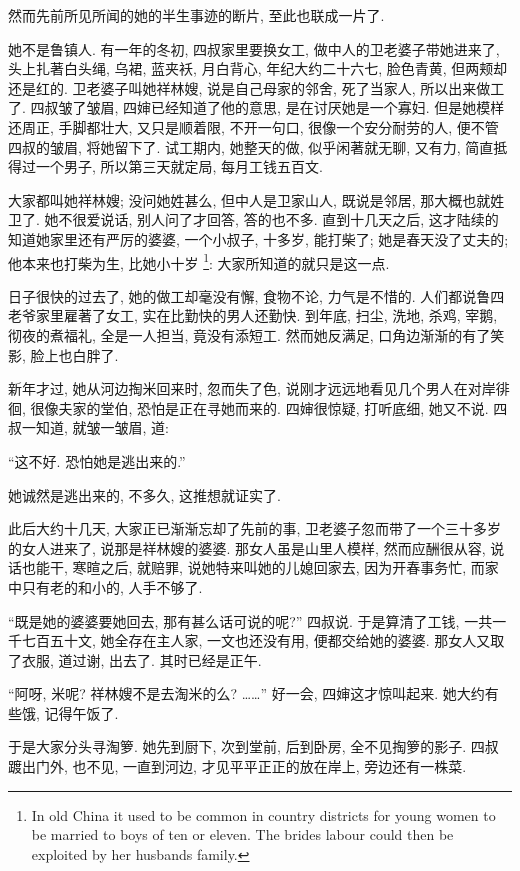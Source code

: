 然而先前所见所闻的她的半生事迹的断片,
至此也联成一片了.

她不是鲁镇人.
有一年的冬初, 四叔家里要换女工,
做中人的卫老婆子带她进来了,
头上扎著白头绳, 乌裙, 蓝夹袄, 月白背心,
年纪大约二十六七, 脸色青黄, 但两颊却还是红的.
卫老婆子叫她祥林嫂, 说是自己母家的邻舍,
死了当家人, 所以出来做工了.
四叔皱了皱眉, 四婶已经知道了他的意思, 是在讨厌她是一个寡妇.
但是她模样还周正, 手脚都壮大, 又只是顺着限,
不开一句口, 很像一个安分耐劳的人,
便不管四叔的皱眉, 将她留下了.
试工期内, 她整天的做, 似乎闲著就无聊,
又有力, 简直抵得过一个男子,
所以第三天就定局, 每月工钱五百文.

大家都叫她祥林嫂;
没问她姓甚么, 但中人是卫家山人,
既说是邻居, 那大概也就姓卫了.
她不很爱说话, 别人问了才回答, 答的也不多.
直到十几天之后, 这才陆续的知道她家里还有严厉的婆婆,
一个小叔子, 十多岁, 能打柴了;
她是春天没了丈夫的;
他本来也打柴为生, 比她小十岁%
\footnote{In old China
    it used to be common in country districts for young women
    to be married to boys of ten or eleven.
    The bride\textquotesingle{}s labour could then
    be exploited by her husband\textquotesingle{}s family.}:
大家所知道的就只是这一点.

日子很快的过去了, 她的做工却毫没有懈, 食物不论, 力气是不惜的.
人们都说鲁四老爷家里雇著了女工, 实在比勤快的男人还勤快.
到年底, 扫尘, 洗地, 杀鸡, 宰鹅, 彻夜的煮福礼,
全是一人担当, 竟没有添短工.
然而她反满足, 口角边渐渐的有了笑影, 脸上也白胖了.

新年才过, 她从河边掏米回来时,
忽而失了色, 说刚才远远地看见几个男人在对岸徘徊,
很像夫家的堂伯, 恐怕是正在寻她而来的.
四婶很惊疑, 打听底细, 她又不说.
四叔一知道, 就皱一皱眉, 道:

``这不好.
恐怕她是逃出来的.''

她诚然是逃出来的, 不多久, 这推想就证实了.

此后大约十几天, 大家正已渐渐忘却了先前的事,
卫老婆子忽而带了一个三十多岁的女人进来了, 说那是祥林嫂的婆婆.
那女人虽是山里人模样, 然而应酬很从容, 说话也能干,
寒暄之后, 就赔罪, 说她特来叫她的儿媳回家去,
因为开春事务忙, 而家中只有老的和小的, 人手不够了.

``既是她的婆婆要她回去, 那有甚么话可说的呢?'' 四叔说.
于是算清了工钱, 一共一千七百五十文,
她全存在主人家, 一文也还没有用, 便都交给她的婆婆.
那女人又取了衣服, 道过谢, 出去了.
其时已经是正午.

``阿呀, 米呢? 祥林嫂不是去淘米的么? ……''
好一会, 四婶这才惊叫起来.
她大约有些饿, 记得午饭了.

于是大家分头寻淘箩.
她先到厨下, 次到堂前, 后到卧房, 全不见掏箩的影子.
四叔踱出门外, 也不见, 一直到河边,
才见平平正正的放在岸上, 旁边还有一株菜.

